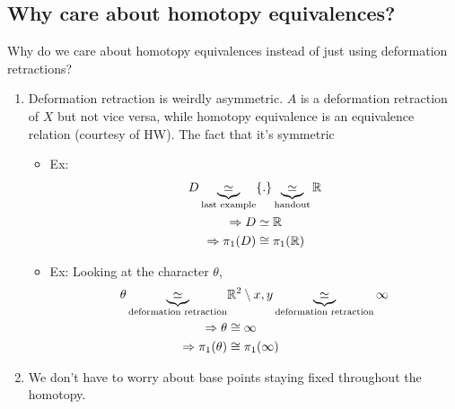 \documentclass[../notes.tex]{subfiles}
\begin{document}
    \subsection{Why care about homotopy equivalences?}
    Why do we care about homotopy equivalences instead of just using deformation retractions?
        \begin{enumerate}
            \item Deformation retraction is weirdly asymmetric. $A$ is a deformation
                retraction of $X$ but not vice versa, while homotopy equivalence is
                an equivalence relation (courtesy of HW). The fact that it's symmetric
                \begin{itemize}
                    \item {Ex:}
                        \begin{align*}
                            D\underbrace{\simeq}_{\text{last example}}& \{.\}
                            \underbrace{\simeq}_{\text{handout}} \mathbb{R}\\
                            \Rightarrow D&\simeq \mathbb{R}\\
                            \Rightarrow \pi_1(D)&\cong \pi_1(\mathbb{R})\\
                        \end{align*}
                    \item {Ex:}
                        Looking at the character $\theta$,
                        \begin{align*}
                            \theta
                            \underbrace{\simeq}_{\text{deformation retraction}}
                            &\mathbb{R}^2\setminus{x,y}
                            \underbrace{\simeq}_{\text{deformation retraction}}
                            \infty\\
                            \Rightarrow \theta &\cong \infty\\
                            \Rightarrow \pi_1(\theta)&\cong \pi_1(\infty)\\
                        \end{align*}
                \end{itemize}
            \item We don't have to worry about base points staying fixed throughout the
                homotopy.
        \end{enumerate}
        
\end{document}
